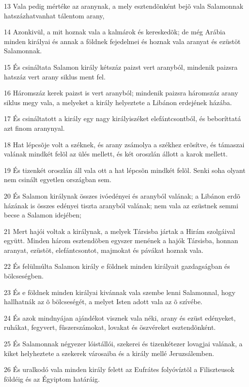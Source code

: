 \par 13 Vala pedig mértéke az aranynak, a mely esztendõnként bejõ vala Salamonnak hatszázhatvanhat tálentom arany,
\par 14 Azonkivül, a mit hoznak vala a kalmárok és kereskedõk; de még Arábia minden királyai és annak a földnek fejedelmei és hoznak vala aranyat és ezüstöt Salamonnak.
\par 15 És csináltata Salamon király kétszáz paizst vert aranyból, mindenik paizsra hatszáz vert arany siklus ment fel.
\par 16 Háromszáz kerek paizst is vert aranyból; mindenik paizsra háromszáz arany siklus megy vala, a melyeket a király helyeztete a Libánon erdejének házába.
\par 17 És csináltatott a király egy nagy királyiszéket elefántcsontból, és beboríttatá azt finom aranynyal.
\par 18 Hat lépcsõje volt a széknek, és arany zsámolya a székhez erõsítve, és támaszai valának mindkét felõl az ülés mellett, és két oroszlán állott a karok mellett.
\par 19 És tizenkét oroszlán áll vala ott a hat lépcsõn mindkét felõl. Senki soha olyant nem csinált egyetlen országban sem.
\par 20 És Salamon királynak összes ivóedényei és aranyból valának; a Libánon erdõ házának is összes edényei tiszta aranyból valának; nem vala az ezüstnek semmi becse a Salamon idejében;
\par 21 Mert hajói voltak a királynak, a melyek Társisba jártak a Hirám szolgáival együtt. Minden három esztendõben egyszer menének a hajók Társisba, honnan aranyat, ezüstöt, elefántcsontot, majmokat és pávákat hoznak vala.
\par 22 És felülmúlta Salamon király e földnek minden királyait gazdagságban és bölcseségben.
\par 23 És e földnek minden királyai kivánnak vala szembe lenni Salamonnal, hogy hallhatnák az õ bölcseségét, a melyet Isten adott vala az õ szívébe.
\par 24 És azok mindnyájan ajándékot visznek vala néki, arany és ezüst edényeket, ruhákat, fegyvert, fûszerszámokat, lovakat és öszvéreket esztendõnként.
\par 25 És Salamonnak négyezer lóistállói, szekerei és tizenkétezer lovagjai valának, a kiket helyheztete a szekerek városaiba és a király mellé Jeruzsálemben.
\par 26 És uralkodó vala minden király felett az Eufrátes folyóvíztõl a Filiszteusok földéig és az Égyiptom határáig.
